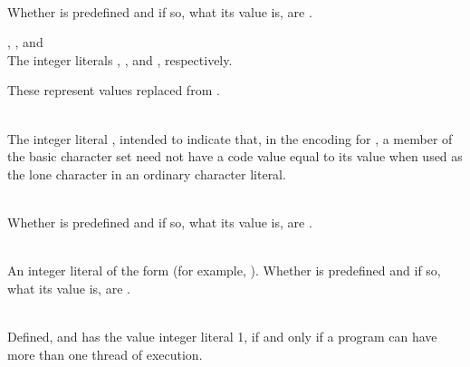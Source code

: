 \begin{description}
\item
{}%
\\
Whether  is predefined and if so, what its value is,
are .

\item
{}%
%
%
, , and \\
The integer literals , , and , respectively.
\begin{note}
These represent values replaced from .
\end{note}

\item
{}%
\\
The integer literal , intended to indicate that, in the encoding for
, a member of the basic character set need not have a code value equal to
its value when used as the lone character in an ordinary character literal.

\item
{}%
\\
Whether  is predefined and if so, what its value is,
are .

\item
{}%
\\
An integer literal of the form 
(for example, ).
Whether  is predefined and
if so, what its value is,
are .

\item
{}%
\\
Defined, and has the value integer literal 1, if and only if a program
can have more than one thread of execution.

\end{description}

